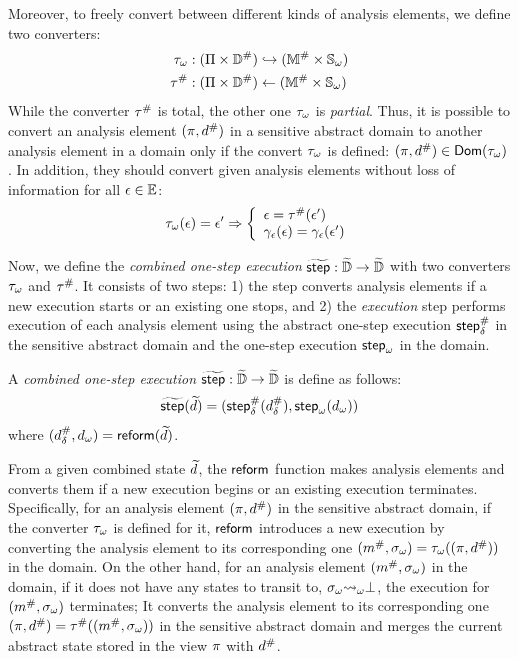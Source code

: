 Moreover, to freely convert between different kinds of analysis elements, we define two converters:
\begin{align}
  {\tau}_\omega & : (\Pi \times {\mathbb{D}}^{\#}) \hookrightarrow
    ({\mathbb{M}}^{\#} \times {\mathbb{S}}_\omega)\\
  {\tau}^{\#} & : (\Pi \times
    {\mathbb{D}}^{\#}) \leftarrow ({\mathbb{M}}^{\#} \times {\mathbb{S}}_\omega)
\end{align}
While the converter ${\tau}^{\#}$ is total, the other one ${\tau}_\omega$ is
\textit{partial}. Thus, it is possible to convert an analysis element
$(\pi, {d}^{\#})$ in a sensitive abstract domain to another analysis element in
a {\sealed} domain only if the convert ${\tau}_\omega$ is defined: $(\pi,
{d}^{\#}) \in \textsf{Dom}({\tau}_\omega)$.  In addition, they should convert given
analysis elements without loss of information for all $\epsilon \in \mathbb{E}$:
\[
  {\tau}_\omega(\epsilon) = \epsilon' \Rightarrow \left\{
  \begin{array}{l}
    \epsilon = {\tau}^{\#}(\epsilon')\\
    \gamma_{\epsilon}(\epsilon) = \gamma_{\epsilon}(\epsilon')\\
  \end{array}
  \right.
\]

Now, we define the \textit{combined one-step execution} $\widetilde{\textsf{step}}: \widetilde{\mathbb{D}}
\rightarrow \widetilde{\mathbb{D}}$ with two converters ${\tau}_\omega$ and ${\tau}^{\#}$.
It consists of two steps: 1) the \textit{} step converts
analysis elements if a new {\sealed} execution starts or an
existing one stops, and 2) the \textit{execution} step performs execution of each
analysis element using the abstract one-step execution ${\textsf{step}}^{\#}_\delta$ in the sensitive
abstract domain and the {\sealed} one-step execution ${\textsf{step}}_\omega$ in the {\sealed} domain.
\begin{definition}
A \textit{combined one-step execution} $\widetilde{\textsf{step}}: \widetilde{\mathbb{D}} \rightarrow
\widetilde{\mathbb{D}}$ is define as follows:
  \[
    \widetilde{\textsf{step}}(\widetilde{d}) = ({\textsf{step}}^{\#}_\delta({{d}^{\#}_\delta}), {\textsf{step}}_\omega({{d}_\omega}))
  \]
where $({{d}^{\#}_\delta}, {{d}_\omega}) = \textsf{reform}(\widetilde{d})$.
\end{definition}

From a given combined state $\widetilde{d}$, the $\textsf{reform}$ function makes analysis elements
and converts them if a new {\sealed} execution
begins or an existing {\sealed} execution terminates.
Specifically, for an analysis element $(\pi, {d}^{\#})$ in the sensitive abstract domain,
if the converter ${\tau}_\omega$ is defined for it, $\textsf{reform}$ introduces a new {\sealed} execution
by converting the analysis element to its corresponding one $({m}^{\#}, {\sigma}_\omega) =
{\tau}_\omega((\pi, {d}^{\#}))$ in the {\sealed} domain.
On the other hand, for an analysis element $({m}^{\#}, {\sigma}_\omega)$ in the {\sealed} domain,
if it does not have any {\sealed} states to transit to, ${\sigma}_\omega {\leadsto}_\omega \bot$,
the {\sealed} execution for $({m}^{\#}, {\sigma}_\omega)$ terminates;
It converts the analysis element to its corresponding one $(\pi, {d}^{\#}) =
{\tau}^{\#}(({m}^{\#}, {\sigma}_\omega))$ in the sensitive abstract domain and
merges the current abstract state stored in the view $\pi$ with ${d}^{\#}$.

